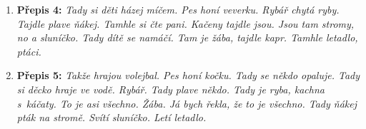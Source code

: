\begin{enumerate}
{		      v tričko, šortky.}
	\item \textbf{Přepis 4:} \emph{Tady si děti házej míčem. Pes honí veverku. Rybář chytá ryby. Tajdle plave ňákej.
		      Tamhle si čte pani. Kačeny tajdle jsou. Jsou tam stromy, no a sluníčko. Tady dítě se
		      namáčí. Tam je žába, tajdle kapr. Tamhle letadlo, ptáci.}
	\item \textbf{Přepis 5:} \emph{Takže hrajou volejbal. Pes honí kočku. Tady se někdo opaluje. Tady si děcko hraje ve
		      vodě. Rybář. Tady plave někdo. Tady je ryba, kachna s káčaty. To je asi všechno. Žába.
		      Já bych řekla, že to je všechno. Tady ňákej pták na stromě. Svítí sluníčko. Letí letadlo.}
\end{enumerate}
